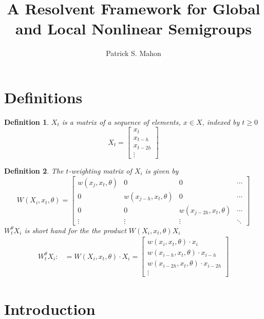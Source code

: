 \documentclass{article}
\newtheorem{definition}{Definition}
\begin{document}
\title{A Resolvent Framework for Global and Local Nonlinear Semigroups}
\author{Patrick S. Mahon}
\maketitle

\tableofcontents
\printunsrtglossary[type=symbols,style=long]

\section{Definitions}
\begin{definition}
$X_t$ is a matrix of a sequence of elements, $x \in X$, indexed by $t\geq0$
$$ X_t = 
\begin{bmatrix}
    x_t \\ 
    x_{t-h} \\ 
    x_{t-2h} \\
    \vdots
\end{bmatrix}
$$
\end{definition}

\begin{definition}
The $t$-weighting matrix of $X_i$ is given by $$W(X_i, x_t, \theta) =
\begin{bmatrix}
    w(x_j, x_t, \theta) & 0 & 0 &\cdots \\
    0 & w(x_{j-h}, x_t, \theta) & 0 &  \cdots\\
    0 & 0 & w(x_{j-2h}, x_t, \theta) & \cdots\\
    \vdots & \vdots & \vdots & \ddots
\end{bmatrix}$$\medskip
$W_t^\theta X_{i}$ is short hand for the the product $W(X_i, x_t, \theta) X_i$ 
\begin{align*}
    W_t^\theta X_{i} :&= W(X_i, x_t, \theta) \cdot X_i = 
    \begin{bmatrix}
        w(x_i, x_t, \theta) \cdot x_i \\
        w(x_{i-h}, x_t, \theta) \cdot x_{i-h} \\
        w(x_{i-2h}, x_t, \theta) \cdot x_{i-2h} \\
        \vdots
\end{bmatrix}
\end{align*}
\end{definition}

\section{Introduction}
\end{document}
